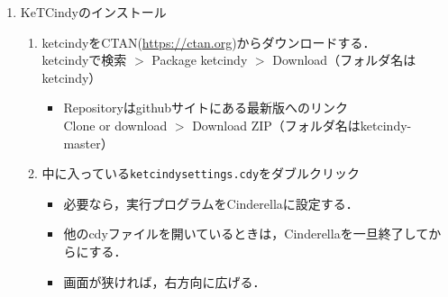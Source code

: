 \documentclass{ujarticle}
\begin{document}
\begin{enumerate}[\bf\large 1.]
\item KeTCindyのインストール\vspace{-2mm}
  \begin{enumerate}[(1)]
  \item ketcindyをCTAN(\url{https://ctan.org})からダウンロードする．\\
  \hspace*{10mm}ketcindyで検索 $>$ Package ketcindy $>$ Download（フォルダ名はketcindy）
    \begin{itemize}
    \item Repositoryはgithubサイトにある最新版へのリンク\\
        \hspace*{10mm}Clone or download $>$ Download ZIP（フォルダ名はketcindy-master）        \end{itemize}
  \item 中に入っている\verb|ketcindysettings.cdy|をダブルクリック
    \begin{itemize}
    \item 必要なら，実行プログラムをCinderellaに設定する．
    \item 他のcdyファイルを開いているときは，Cinderellaを一旦終了してからにする．
   \item 画面が狭ければ，右方向に広げる．
   \end{itemize}

\vspace{3mm}


\end{enumerate}
\end{enumerate}
\end{document}
